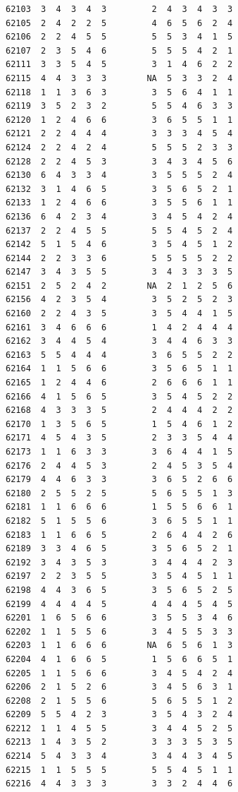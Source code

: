 \documentclass[
  letterpaper,
  DIV=11,
  numbers=noendperiod]{scrreprt}
\begin{document}
\begin{verbatim}
62103  3  4  3  4  3         2  4  3  4  3  3
62105  2  4  2  2  5         4  6  5  6  2  4
62106  2  2  4  5  5         5  5  3  4  1  5
62107  2  3  5  4  6         5  5  5  4  2  1
62111  3  3  5  4  5         3  1  4  6  2  2
62115  4  4  3  3  3        NA  5  3  3  2  4
62118  1  1  3  6  3         3  5  6  4  1  1
62119  3  5  2  3  2         5  5  4  6  3  3
62120  1  2  4  6  6         3  6  5  5  1  1
62121  2  2  4  4  4         3  3  3  4  5  4
62124  2  2  4  2  4         5  5  5  2  3  3
62128  2  2  4  5  3         3  4  3  4  5  6
62130  6  4  3  3  4         3  5  5  5  2  4
62132  3  1  4  6  5         3  5  6  5  2  1
62133  1  2  4  6  6         3  5  5  6  1  1
62136  6  4  2  3  4         3  4  5  4  2  4
62137  2  2  4  5  5         5  5  4  5  2  4
62142  5  1  5  4  6         3  5  4  5  1  2
62144  2  2  3  3  6         5  5  5  5  2  2
62147  3  4  3  5  5         3  4  3  3  3  5
62151  2  5  2  4  2        NA  2  1  2  5  6
62156  4  2  3  5  4         3  5  2  5  2  3
62160  2  2  4  3  5         3  5  4  4  1  5
62161  3  4  6  6  6         1  4  2  4  4  4
62162  3  4  4  5  4         3  4  4  6  3  3
62163  5  5  4  4  4         3  6  5  5  2  2
62164  1  1  5  6  6         3  5  6  5  1  1
62165  1  2  4  4  6         2  6  6  6  1  1
62166  4  1  5  6  5         3  5  4  5  2  2
62168  4  3  3  3  5         2  4  4  4  2  2
62170  1  3  5  6  5         1  5  4  6  1  2
62171  4  5  4  3  5         2  3  3  5  4  4
62173  1  1  6  3  3         3  6  4  4  1  5
62176  2  4  4  5  3         2  4  5  3  5  4
62179  4  4  6  3  3         3  6  5  2  6  6
62180  2  5  5  2  5         5  6  5  5  1  3
62181  1  1  6  6  6         1  5  5  6  6  1
62182  5  1  5  5  6         3  6  5  5  1  1
62183  1  1  6  6  5         2  6  4  4  2  6
62189  3  3  4  6  5         3  5  6  5  2  1
62192  3  4  3  5  3         3  4  4  4  2  3
62197  2  2  3  5  5         3  5  4  5  1  1
62198  4  4  3  6  5         3  5  6  5  2  5
62199  4  4  4  4  5         4  4  4  5  4  5
62201  1  6  5  6  6         3  5  5  3  4  6
62202  1  1  5  5  6         3  4  5  5  3  3
62203  1  1  6  6  6        NA  6  5  6  1  3
62204  4  1  6  6  5         1  5  6  6  5  1
62205  1  1  5  6  6         3  4  5  4  2  4
62206  2  1  5  2  6         3  4  5  6  3  1
62208  2  1  5  5  6         5  6  5  5  1  2
62209  5  5  4  2  3         3  5  4  3  2  4
62212  1  1  4  5  5         3  4  4  5  2  5
62213  1  4  3  5  2         3  3  3  5  3  5
62214  5  4  3  3  4         3  4  4  3  4  5
62215  1  1  5  5  5         5  5  4  5  1  1
62216  4  4  3  3  3         3  3  2  4  4  6

\end{verbatim}
\end{document}
